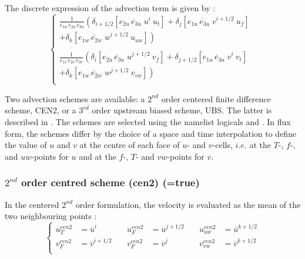 \documentclass[NEMO_book]{subfiles}
\begin{document}
The discrete expression of the advection term is given by :
\begin{equation} \label{Eq_dynadv}
\left\{ 
\begin{aligned}
\frac{1}{e_{1u}\,e_{2u}\,e_{3u}} 
\left(      \delta _{i+1/2} \left[ \overline{e_{2u}\,e_{3u}\;u }^{i       }  \ u_t      \right]    
          + \delta _{j       } \left[ \overline{e_{1u}\,e_{3u}\;v }^{i+1/2}  \ u_f      \right] \right.  \ \;   \\
\left.   + \delta _{k      } \left[ \overline{e_{1w}\,e_{2w}\;w}^{i+1/2}  \ u_{uw} \right] \right)   \\
\\
\frac{1}{e_{1v}\,e_{2v}\,e_{3v}} 
\left(     \delta _{i       } \left[ \overline{e_{2u}\,e_{3u }\;u }^{j+1/2} \ v_f       \right] 
         + \delta _{j+1/2} \left[ \overline{e_{1u}\,e_{3u }\;v }^{i       } \ v_t       \right] \right.  \ \, \, \\
\left.  + \delta _{k      } \left[ \overline{e_{1w}\,e_{2w}\;w}^{j+1/2} \ v_{vw}  \right] \right) \\
\end{aligned}
\right.
\end{equation}

Two advection schemes are available: a $2^{nd}$ order centered finite 
difference scheme, CEN2, or a $3^{rd}$ order upstream biased scheme, UBS. 
The latter is described in \citet{Shchepetkin_McWilliams_OM05}. The schemes are 
selected using the namelist logicals  and . 
In flux form, the schemes differ by the choice of a space and time interpolation to 
define the value of $u$ and $v$ at the centre of each face of $u$- and $v$-cells, 
$i.e.$ at the $T$-, $f$-, and $uw$-points for $u$ and at the $f$-, $T$- and 
$vw$-points for $v$. 

\subsubsection{$2^{nd}$ order centred scheme (cen2) (=true)}
\label{DYN_adv_cen2}

In the centered $2^{nd}$ order formulation, the velocity is evaluated as the 
mean of the two neighbouring points :
\begin{equation} \label{Eq_dynadv_cen2}
\left\{ 		\begin{aligned}
 u_T^{cen2} &=\overline u^{i }       \quad &  u_F^{cen2} &=\overline u^{j+1/2}  \quad &  u_{uw}^{cen2} &=\overline u^{k+1/2}   \\
 v_F^{cen2} &=\overline v ^{i+1/2} \quad & v_F^{cen2} &=\overline v^j		\quad &  v_{vw}^{cen2} &=\overline v ^{k+1/2}  \\
\end{aligned}      \right.
\end{equation} 
\end{document}

